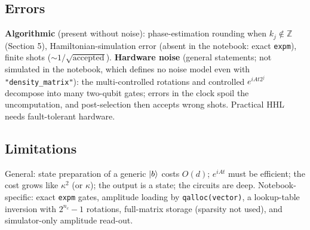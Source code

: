 \documentclass[11pt,a4paper,openany]{book}
\begin{document}
\subsection{Errors}
\textbf{Algorithmic} (present without noise): phase-estimation rounding when $k_j \notin \mathbb Z$ (Section 5), Hamiltonian-simulation error (absent in the notebook:
exact \texttt{expm}), finite shots ($\sim1/\sqrt{\text{accepted}}$). \textbf{Hardware noise} (general statements; not simulated in the notebook, which defines
no noise model even with \texttt{"density\_matrix"}): the multi-controlled rotations and controlled $e^{iAt2^j}$ decompose into many two-qubit gates; errors
in the clock spoil the uncomputation, and post-selection then accepts wrong shots. Practical HHL needs fault-tolerant hardware.

\subsection{Limitations}
General: state preparation of a generic $\ket b$ costs $O(d)$; $e^{iAt}$ must be efficient; the cost grows like $\kappa^2$ (or $\kappa$); the output is a state;
the circuits are deep. Notebook-specific: exact \texttt{expm} gates, amplitude loading by \texttt{qalloc(vector)}, a lookup-table inversion with $2^{n_c} - 1$ rotations,
full-matrix storage (sparsity not used), and simulator-only amplitude read-out.
\end{document}
